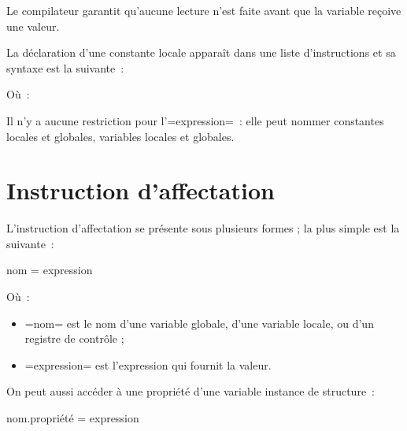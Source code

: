 Le compilateur garantit qu'aucune lecture n'est faite avant que la variable reçoive une valeur.











La déclaration d'une constante locale apparaît dans une liste d'instructions et sa syntaxe est la suivante~:


Où~:

Il n'y a aucune restriction pour l'\plm=expression=~: elle peut nommer constantes locales et globales, variables locales et globales.






\section {Instruction d'affectation}

L'instruction d'affectation se présente sous plusieurs formes ; la plus simple est la suivante~:

\begin{PLM}
nom = expression
\end{PLM}

Où~:
\begin{itemize}
  \item \plm=nom= est le nom d'une variable globale, d'une variable locale, ou d'un registre de contrôle ;
  \item \plm=expression= est l'expression qui fournit la valeur.
\end{itemize}

On peut aussi accéder à une propriété d'une variable instance de structure~:
\begin{PLM}
nom.propriété = expression
\end{PLM}

